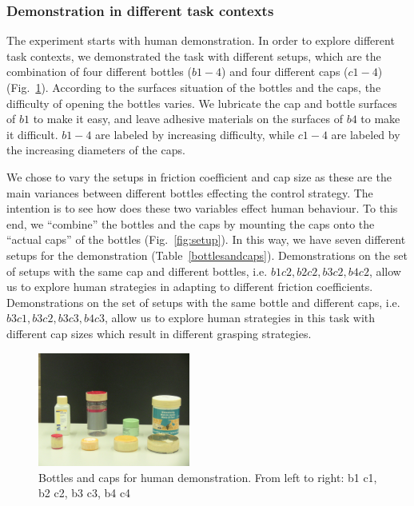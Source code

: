 \subsubsection{Demonstration in different task contexts}
\label{sec:exp_context}
The experiment starts with human demonstration. In order to explore different task contexts, we demonstrated the task with different setups, which are the combination of four different bottles ($b1-4$) and four different caps ($c1-4$) (Fig.~\ref{fig:b_c}). According to the surfaces situation of the bottles and the caps, the difficulty of opening the bottles varies. We lubricate the cap and bottle surfaces of $b1$ to make it easy, and leave adhesive materials on the surfaces of $b4$ to make it difficult. $b1-4$ are labeled by increasing difficulty, while $c1-4$ are labeled by the increasing diameters of the caps.


We chose to vary the setups in friction coefficient and cap size as these are the main variances between different bottles effecting the control strategy. The intention is to see how does these two variables effect human behaviour. To this end, we ``combine'' the bottles and the caps by mounting the caps onto the ``actual caps'' of the bottles (Fig.~\ref{fig:setup}). In this way, we have seven different setups for the demonstration (Table~\ref{bottlesandcaps}). Demonstrations on the set of setups with the same cap and different bottles, i.e. $b1c2, b2c2, b3c2, b4c2$, allow us to explore human strategies in adapting to different friction coefficients. Demonstrations on the set of setups with the same bottle and different caps, i.e. $b3c1, b3c2, b3c3, b4c3$, allow us to explore human strategies in this task with different cap sizes which result in different grasping strategies.

\begin{figure}
  \centering
  \includegraphics[width=5cm]{./fig/b_c.jpg}
  \caption{ \scriptsize{Bottles and caps for human demonstration. From left to right: b1 c1, b2 c2, b3 c3, b4  c4}
}
\label{fig:b_c}
\end{figure}



